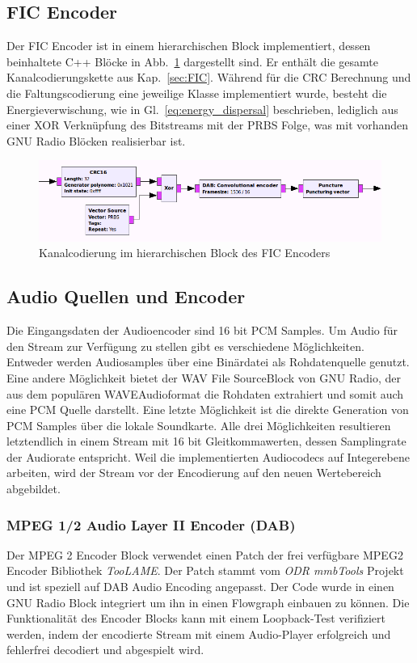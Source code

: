 \subsection{FIC Encoder}
\label{sec:fic_encoder}
Der FIC Encoder ist in einem hierarchischen Block implementiert, dessen beinhaltete C++ Blöcke in Abb.~\ref{fig:fic_encoder} dargestellt sind. Er enthält die gesamte Kanalcodierungskette aus Kap.~\ref{sec:FIC}. Während für die CRC Berechnung und die Faltungscodierung eine jeweilige Klasse implementiert wurde, besteht die Energieverwischung, wie in Gl.~\ref{eq:energy_dispersal} beschrieben, lediglich aus einer XOR Verknüpfung des Bitstreams mit der PRBS Folge, was mit vorhanden GNU Radio Blöcken realisierbar ist.

\begin{figure}[ht]
\centering
  \includegraphics[width=\textwidth]{figures/FIC_encoder.png}
	\caption{Kanalcodierung im hierarchischen Block des FIC Encoders}
	\label{fig:fic_encoder}
\end{figure}

\subsection{Audio Quellen und Encoder}
Die Eingangsdaten der Audioencoder sind 16 bit \ac{PCM} Samples. Um Audio für den Stream zur Verfügung zu stellen gibt es verschiedene Möglichkeiten. Entweder werden Audiosamples über eine Binärdatei als Rohdatenquelle genutzt. Eine andere Möglichkeit bietet der \dq WAV File Source\dq Block von GNU Radio, der aus dem populären \dq WAVE\dq Audioformat die Rohdaten extrahiert und somit auch eine PCM Quelle darstellt. Eine letzte Möglichkeit ist die direkte Generation von PCM Samples über die lokale Soundkarte. Alle drei Möglichkeiten resultieren letztendlich in einem Stream mit 16 bit Gleitkommawerten, dessen Samplingrate der Audiorate entspricht. Weil die implementierten Audiocodecs auf Integerebene arbeiten, wird der Stream vor der Encodierung auf den neuen Wertebereich abgebildet.

\subsubsection{MPEG 1/2 Audio Layer II Encoder (DAB)}
Der MPEG 2 Encoder Block verwendet einen Patch der frei verfügbare MPEG2 Encoder Bibliothek \textit{TooLAME}. Der Patch stammt vom \textit{ODR mmbTools} Projekt \cite{repo:odr_audioenc} und ist speziell auf DAB Audio Encoding angepasst. Der Code wurde in einen GNU Radio Block integriert um ihn in einen Flowgraph einbauen zu können. Die Funktionalität des Encoder Blocks kann mit einem Loopback-Test verifiziert werden, indem der encodierte Stream mit einem Audio-Player erfolgreich und fehlerfrei decodiert und abgespielt wird.

